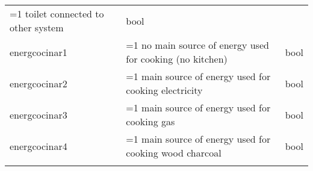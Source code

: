 \documentclass[11pt]{article}
\begin{document}
\begin{longtable}[]{@{}lll@{}}
\begin{minipage}[t]{0.16\columnwidth}
=1 toilet connected to other system\strut
\end{minipage} & \begin{minipage}[t]{0.24\columnwidth}\raggedright\strut
bool\strut
\end{minipage}\tabularnewline
\begin{minipage}[t]{0.19\columnwidth}\raggedright\strut
energcocinar1\strut
\end{minipage} & \begin{minipage}[t]{0.16\columnwidth}\raggedright\strut
=1 no main source of energy used for cooking (no kitchen)\strut
\end{minipage} & \begin{minipage}[t]{0.24\columnwidth}\raggedright\strut
bool\strut
\end{minipage}\tabularnewline
\begin{minipage}[t]{0.19\columnwidth}\raggedright\strut
energcocinar2\strut
\end{minipage} & \begin{minipage}[t]{0.16\columnwidth}\raggedright\strut
=1 main source of energy used for cooking electricity\strut
\end{minipage} & \begin{minipage}[t]{0.24\columnwidth}\raggedright\strut
bool\strut
\end{minipage}\tabularnewline
\begin{minipage}[t]{0.19\columnwidth}\raggedright\strut
energcocinar3\strut
\end{minipage} & \begin{minipage}[t]{0.16\columnwidth}\raggedright\strut
=1 main source of energy used for cooking gas\strut
\end{minipage} & \begin{minipage}[t]{0.24\columnwidth}\raggedright\strut
bool\strut
\end{minipage}\tabularnewline
\begin{minipage}[t]{0.19\columnwidth}\raggedright\strut
energcocinar4\strut
\end{minipage} & \begin{minipage}[t]{0.16\columnwidth}\raggedright\strut
=1 main source of energy used for cooking wood charcoal\strut
\end{minipage} & \begin{minipage}[t]{0.24\columnwidth}\raggedright\strut
bool\strut
\end{minipage}\tabularnewline
\begin{minipage}[t]{0.19\columnwidth}\raggedright\strut

\end{minipage}
\end{longtable}
\end{document}
